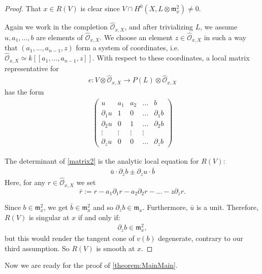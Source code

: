 \documentclass[11pt,reqno]{amsart}
\theoremstyle{plain}
\theoremstyle{definition}
\theoremstyle{remark}
\numberwithin{equation}{section}
\newcommand{\cO}{{\mathcal O}}
\renewcommand{\to}{{\longrightarrow}}
\numberwithin{equation}{section}
\begin{document}
\begin{proof}
  That $x \in R(V)$ is clear since $V \cap H^{0}(X,L \otimes \mathfrak{m}^{2}_{x}) \neq 0 $.

  Again we work in the completion $\widehat{\cO}_{x,X}$, and after trivializing $L$, we assume $u, a_{1}, ..., b$ are elements of $\widehat{\cO}_{x,X}$. We choose an element $z \in \widehat{\cO}_{x,X}$ in such a way that $(a_{1}, ..., a_{n-1}, z)$ form a system of coordinates, i.e. $\widehat{\cO}_{x,X} \simeq k[[a_{1}, ..., a_{n-1}, z ]]$.  With respect to these coordinates, a local matrix representative for \begin{align*}
  e: V \otimes \widehat{\cO}_{x,X} \to P(L) \otimes \widehat{\cO}_{x,X}
\end{align*}
has the form
\begin{align}\label{matrix2}
\begin{pmatrix}
  u & a_{1} & a_{2} & \dots & b \\
  \partial_{1}u & 1 & 0 & \dots & \partial_{1}b \\
  \partial_{2}u & 0 & 1 & \dots & \partial_{2}b \\
  \vdots & \vdots & \vdots & \vdots \\
  \partial_{z}u  & 0 & 0 & \dots & \partial_{z}b
\end{pmatrix}
\end{align}

The determinant of \ref{matrix2} is the analytic local equation for $R(V)$: 
\begin{align*}
   \bar{u} \cdot \partial_{z}b \pm \partial_{z}u \cdot \bar{b}
 \end{align*} 
 Here, for any $r \in \widehat{\cO}_{x,X}$ we set $$\bar{r} := r - a_{1}\partial_{1}r - a_{2}\partial_{2}r - ... - z \partial_{z} r.$$

 Since $b \in {\mathfrak m}^{2}_{x}$, we get $\bar{b} \in {\mathfrak m}^{2}_{x}$ and so $\partial_{z}b \in {\mathfrak m}_{x}$.  Furthermore, $\bar{u}$ is a unit.  Therefore,  $R(V)$ is singular at $x$ if and only if: 
 \begin{align*}
  \partial_{z}b \in {\mathfrak m}^{2}_{x},
 \end{align*}
 but this would render the tangent cone of $v(b)$ degenerate, contrary to our third assumption. So $R(V)$ is smooth at $x$.
\end{proof}

Now we are ready for the proof of \autoref{theorem:MainMain}. 
\end{document}
